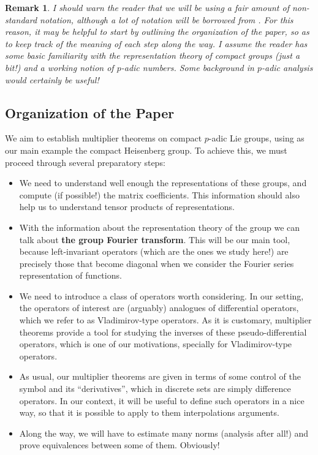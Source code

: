 \documentclass[12pt, reqno]{amsart}
\newtheorem{rem}[defi]{Remark}
\newcommand{\1}{\mathds{1}}
\begin{document}
\begin{rem}
    I should warn the reader that we will be using a fair amount of non-standard notation, although a lot of notation will be borrowed from \cite{Fischer2015, Fischer2020, Ruzhansky2010, Ruzhansky2015}. For this reason, it may be helpful to start by outlining the organization of the paper, so as to keep track of the meaning of each step along the way. I assume the reader has some basic familiarity with the representation theory of compact groups (just a bit!) and a working notion of $p$-adic numbers. Some background in $p$-adic analysis would certainly be useful! 
\end{rem}

\subsection{Organization of the Paper}
We aim to establish multiplier theorems on compact $p$-adic Lie groups, using as our main example the compact Heisenberg group. To achieve this, we must proceed through several preparatory steps:

\begin{itemize}
    \item We need to understand well enough the representations of these groups, and compute (if possible!) the matrix coefficients. This information should also help us to understand tensor products of representations.
    \item With the information about the representation theory of the group we can talk about \textbf{the group Fourier transform}. This will be our main tool, because left-invariant operators (which are the ones we study here!) are precisely those that become diagonal when we consider the Fourier series representation of functions.     
    \item We need to introduce a class of operators worth considering. In our setting, the operators of interest are (arguably) analogues of differential operators, which we refer to as Vladimirov-type operators. As it is customary, multiplier theorems provide a tool for studying the inverses of these pseudo-differential operators, which is one of our motivations, specially for Vladimirov-type operators.
    \item As usual, our multiplier theorems are given in terms of some control of the symbol and its “derivatives”, which in discrete sets are simply difference operators. In our context, it will be useful to define such operators in a nice way, so that it is possible to apply to them interpolations arguments.  
    \item Along the way, we will have to estimate many norms (analysis after all!) and prove equivalences between some of them. Obviously!   
\end{itemize}
\end{document}
